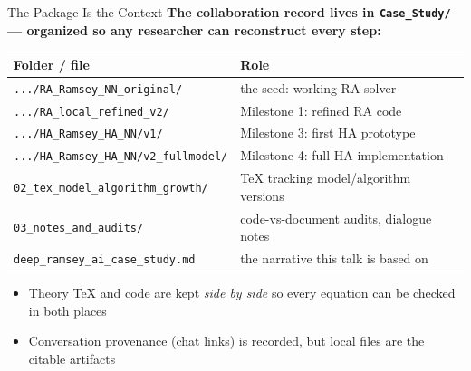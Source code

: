 \documentclass[10pt,aspectratio=169]{beamer}
\newcommand{\compacttables}{\renewcommand{\arraystretch}{1.15}}
\begin{document}
\begin{frame}{The Package Is the Context}
\textbf{The collaboration record lives in \texttt{Case\_Study/} --- organized so any researcher can reconstruct every step:}

\smallskip
\compacttables
\begin{center}\footnotesize
\begin{tabular}{p{5.9cm}p{6.0cm}}
\toprule
\textbf{Folder / file} & \textbf{Role} \\
\midrule
\texttt{.../RA\_Ramsey\_NN\_original/} & the seed: working RA solver \\
\texttt{.../RA\_local\_refined\_v2/} & Milestone 1: refined RA code \\
\texttt{.../HA\_Ramsey\_HA\_NN/v1/} & Milestone 3: first HA prototype \\
\texttt{.../HA\_Ramsey\_HA\_NN/v2\_fullmodel/} & Milestone 4: full HA implementation \\
\texttt{02\_tex\_model\_algorithm\_growth/} & TeX tracking model/algorithm versions \\
\texttt{03\_notes\_and\_audits/} & code-vs-document audits, dialogue notes \\
\texttt{deep\_ramsey\_ai\_case\_study.md} & the narrative this talk is based on \\
\bottomrule
\end{tabular}
\end{center}

\smallskip
\begin{itemize}\small
    \item Theory TeX and code are kept \emph{side by side} so every equation can be checked in both places
    \item Conversation provenance (chat links) is recorded, but local files are the citable artifacts
\end{itemize}
\end{frame}
\end{document}

